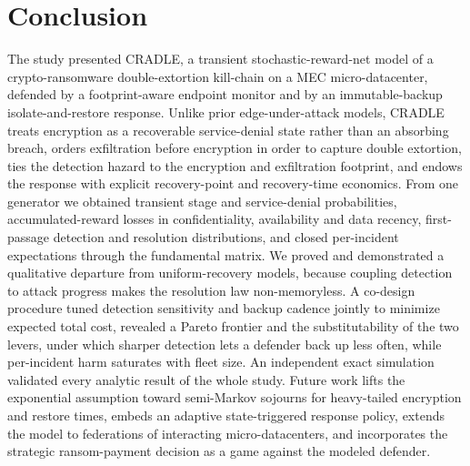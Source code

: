 \documentclass[journal]{IEEEtran}
\begin{document}
\section{Conclusion}\label{sec:concl}
The study presented CRADLE, a transient stochastic-reward-net model of a
crypto-ransomware double-extortion kill-chain on a MEC micro-datacenter,
defended by a footprint-aware endpoint monitor and by an immutable-backup
isolate-and-restore response. Unlike prior edge-under-attack models, CRADLE
treats encryption as a recoverable service-denial state rather than an absorbing
breach, orders exfiltration before encryption in order to capture double
extortion, ties the detection hazard to the encryption and exfiltration
footprint, and endows the response with explicit recovery-point and
recovery-time economics. From one generator we obtained transient stage and
service-denial probabilities, accumulated-reward losses in confidentiality,
availability and data recency, first-passage detection and resolution
distributions, and closed per-incident expectations through the fundamental
matrix. We proved and demonstrated a qualitative departure from uniform-recovery
models, because coupling detection to attack progress makes the resolution law
non-memoryless. A co-design procedure tuned detection sensitivity and
backup cadence jointly to minimize expected total cost, revealed a Pareto
frontier and the substitutability of the two levers, under which sharper
detection lets a defender back up less often, while per-incident harm saturates
with fleet size. An independent exact simulation validated every analytic
result of the whole study. Future work lifts the exponential assumption toward semi-Markov
sojourns for heavy-tailed encryption and restore times, embeds an adaptive
state-triggered response policy, extends the model to federations of interacting
micro-datacenters, and incorporates the strategic ransom-payment decision as a
game against the modeled defender.
\end{document}
